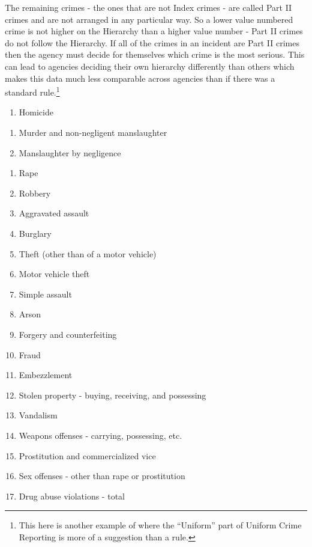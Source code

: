 \documentclass[
]{krantz}
\providecommand{\tightlist}{%
  \setlength{\itemsep}{0pt}\setlength{\parskip}{0pt}}
\begin{document}
The remaining crimes - the ones that are not Index crimes -
are called Part II crimes and are not arranged in any
particular way. So a lower value numbered crime is not
higher on the Hierarchy than a higher value number - Part II
crimes do not follow the Hierarchy. If all of the crimes in
an incident are Part II crimes then the agency must decide
for themselves which crime is the most serious. This can
lead to agencies deciding their own hierarchy differently
than others which makes this data much less comparable
across agencies than if there was a standard
rule.\footnote{This here is another example of where the
  ``Uniform'' part of Uniform Crime Reporting is more of a
  suggestion than a rule.}

\begin{enumerate}
\def\labelenumi{\arabic{enumi}.}
\tightlist
\item
  Homicide
\end{enumerate}

\begin{enumerate}
\def\labelenumi{\alph{enumi}.}
\tightlist
\item
  Murder and non-negligent manslaughter
\item
  Manslaughter by negligence
\end{enumerate}

\begin{enumerate}
\def\labelenumi{\arabic{enumi}.}
\setcounter{enumi}{1}
\tightlist
\item
  Rape
\item
  Robbery
\item
  Aggravated assault
\item
  Burglary
\item
  Theft (other than of a motor vehicle)
\item
  Motor vehicle theft
\item
  Simple assault
\item
  Arson
\item
  Forgery and counterfeiting
\item
  Fraud
\item
  Embezzlement
\item
  Stolen property - buying, receiving, and possessing
\item
  Vandalism
\item
  Weapons offenses - carrying, possessing, etc.
\item
  Prostitution and commercialized vice
\item
  Sex offenses - other than rape or prostitution
\item
  Drug abuse violations - total
\end{enumerate}
\end{document}
